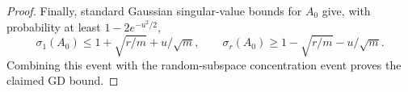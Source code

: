 \documentclass[10pt,a4paper]{amsart}
\begin{document}
\begin{proof}
Finally, standard Gaussian singular-value bounds for \(A_0\) give, with probability at least \(1-2e^{-u^2/2}\),
\[
\sigma_1(A_0)\le1+\sqrt{r/m}+u/\sqrt m,
\qquad
\sigma_r(A_0)\ge1-\sqrt{r/m}-u/\sqrt m.
\]
Combining this event with the random-subspace concentration event proves the claimed GD bound.
\end{proof}
\end{document}
